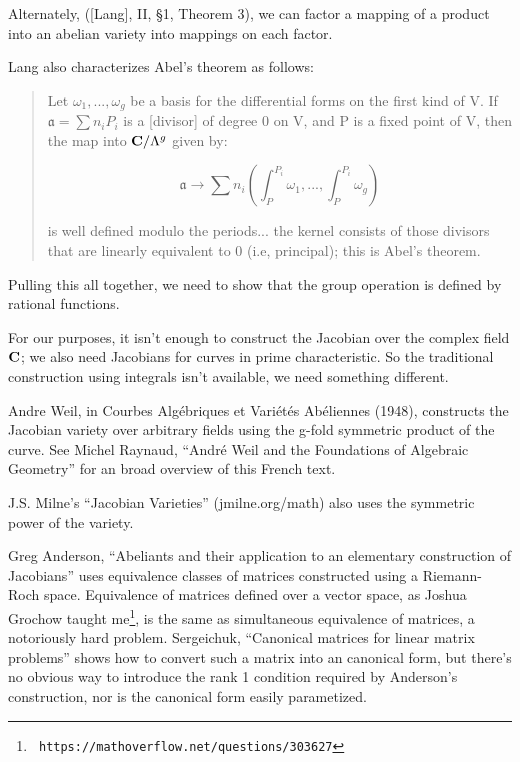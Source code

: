 Alternately, ([Lang], II, \S1, Theorem 3), we can factor a mapping
of a product into an abelian variety into mappings on each factor.

Lang also characterizes Abel's theorem as follows:

\begin{quote}

Let $\omega_1, ..., \omega_g$ be a basis for the differential forms
on the first kind of V.  If $\mathfrak{a} = \sum n_i P_i$ is a
[divisor] of degree 0 on V, and P is a fixed point of V, then
the map into ${\bf C}/\Lambda^g$ given by:

$$\mathfrak{a} \to \sum n_i (\int_P^{P_i}\omega_1, ..., \int_P^{P_i}\omega_g)$$

is well defined modulo the periods... the kernel consists of those
divisors that are linearly equivalent to 0 (i.e, principal); this is
Abel's theorem.

\end{quote}

Pulling this all together, we need to show that the group operation
is defined by rational functions.

For our purposes, it isn't enough to construct the Jacobian over the
complex field $\mathbf{C}$; we also need Jacobians for curves in prime
characteristic.  So the traditional construction using integrals
isn't available, we need something different.

Andre Weil, in Courbes Algébriques et Variétés Abéliennes (1948),
constructs the Jacobian variety over arbitrary fields using the g-fold
symmetric product of the curve.  See Michel Raynaud, ``André Weil and
the Foundations of Algebraic Geometry'' for an broad overview of this
French text.

J.S. Milne's ``Jacobian Varieties'' (jmilne.org/math) also uses the
symmetric power of the variety.

Greg Anderson, ``Abeliants and their application to an elementary
construction of Jacobians'' uses equivalence classes of matrices
constructed using a Riemann-Roch space.  Equivalence of matrices
defined over a vector space, as Joshua Grochow taught me\footnote{\tt
https://mathoverflow.net/questions/303627}, is the same as
simultaneous equivalence of matrices, a notoriously hard problem.
Sergeichuk, ``Canonical matrices for linear matrix problems''
shows how to convert such a matrix into an canonical form,
but there's no obvious way to introduce the rank 1 condition
required by Anderson's construction, nor is the canonical form
easily parametized.




